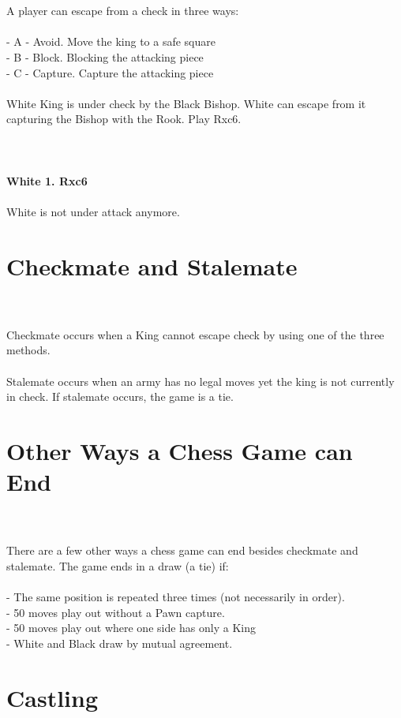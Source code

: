 \documentclass{article}
\begin{document}

\\
\\
A player can escape from a check in three ways:\\\\- A - Avoid. Move the king to a safe square\\- B - Block. Blocking the attacking piece\\- C - Capture. Capture the attacking piece\\\\White King is under check by the Black Bishop. White can escape from it capturing the Bishop with the Rook. Play Rxc6.\\
\\

\\
\\
\textbf{White 1. Rxc6}\\
\\
White is not under attack anymore.\section{ Checkmate and Stalemate}

\\
\\
Checkmate occurs when a King cannot escape check by using one of the three methods.\\\\Stalemate occurs when an army has no legal moves yet the king is not currently in check. If stalemate occurs, the game is a tie.\section{ Other Ways a Chess Game can End}

\\
\\
There are a few other ways a chess game can end besides checkmate and stalemate. The game ends in a draw (a tie) if:\\\\- The same position is repeated three times (not necessarily in order).\\- 50 moves play out without a Pawn capture.\\- 50 moves play out where one side has only a King\\- White and Black draw by mutual agreement.\section{ Castling}
\end{document}

